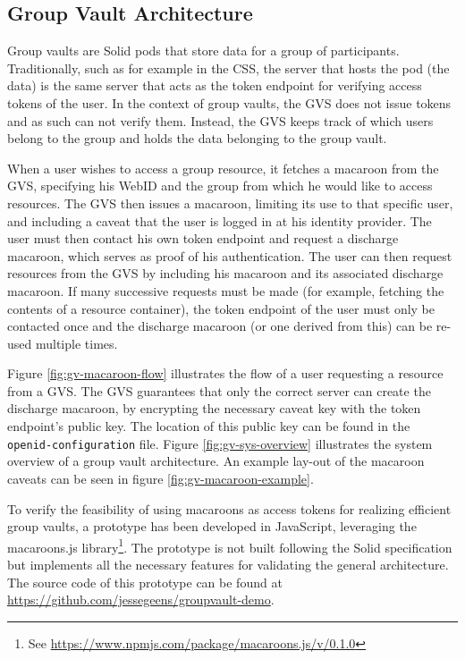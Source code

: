 \subsection{Group Vault Architecture}
Group vaults are Solid pods that store data for a group of participants. Traditionally, such as for example in the \acrlong{CSS}, the server that hosts the pod (the data) is the same server that acts as the token endpoint for verifying access tokens of the user. In the context of group vaults, the \gls{GVS} does not issue tokens and as such can not verify them. Instead, the \gls{GVS} keeps track of which users belong to the group and holds the data belonging to the group vault.

When a user wishes to access a group resource, it fetches a macaroon from the \gls{GVS}, specifying his WebID and the group from which he would like to access resources. The \gls{GVS} then issues a macaroon, limiting its use to that specific user, and including a caveat that the user is logged in at his identity provider. The user must then contact his own token endpoint and request a discharge macaroon, which serves as proof of his authentication. The user can then request resources from the \gls{GVS} by including his macaroon and its associated discharge macaroon. If many successive requests must be made (for example, fetching the contents of a resource container), the token endpoint of the user must only be contacted once and the discharge macaroon (or one derived from this) can be re-used multiple times. 

Figure \ref{fig:gv-macaroon-flow} illustrates the flow of a user requesting a resource from a \gls{GVS}. The \gls{GVS} guarantees that only the correct server can create the discharge macaroon, by encrypting the necessary caveat key with the token endpoint's public key. The location of this public key can be found in the \texttt{openid-configuration} file. Figure \ref{fig:gv-sys-overview} illustrates the system overview of a group vault architecture. An example lay-out of the macaroon caveats can be seen in figure \ref{fig:gv-macaroon-example}.

To verify the feasibility of using macaroons as access tokens for realizing efficient group vaults, a prototype has been developed in JavaScript, leveraging the macaroons.js library\footnote{See \url{https://www.npmjs.com/package/macaroons.js/v/0.1.0}}. The prototype is not built following the Solid specification but implements all the necessary features for validating the general architecture. The source code of this prototype can be found at \url{https://github.com/jessegeens/groupvault-demo}.

